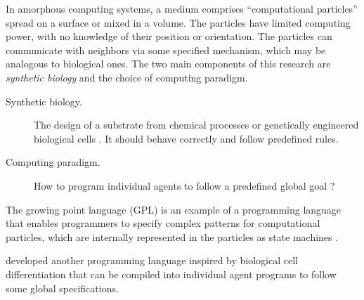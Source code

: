 In amorphous computing systems, a medium comprises ``computational
particles'' spread on a surface or mixed in a volume. The particles have 
limited computing power, with no knowledge of their position or orientation. The
particles can communicate with neighbors via some specified mechanism, which may
be analogous to biological ones. The two main components of this research are 
\emph{synthetic biology} and the choice of computing paradigm.
\begin{description}
  \item[Synthetic biology.] The design of a substrate from chemical processes or
        genetically engineered biological cells
        \parencite{weissVivoDigitalCircuits2002}. It should behave correctly and
        follow predefined rules.
  \item[Computing paradigm.] How to program individual agents to follow a
        predefined global goal
        \parencite{nagpalProgrammableSelfassemblyConstructing2001}?
\end{description}


The growing point language (GPL) is an example of a programming language that
enables programmers to specify complex patterns for computational particles,
which are internally represented in the particles as state machines
\parencite{cooreBotanicalComputingDevelopmental1999}.

\textcite{nagpalProgrammableSelfassemblyUsing2002} developed another
programming language inspired by biological cell differentiation
\parencite{lawrenceMakingFlyGenetics1992,
  wolpertPositionalInformationSpatial1969} that can be compiled into individual agent
programs to follow some global specifications.
